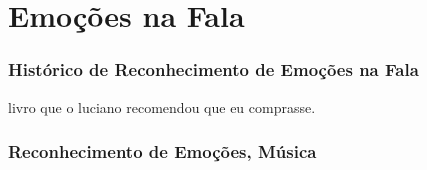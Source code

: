 \chapter{Emoções na Fala}
\label{cap:emo}

\subsection{Histórico de Reconhecimento de Emoções na Fala}
livro que o luciano recomendou que eu comprasse.

\subsection{Reconhecimento de Emoções, Música}



